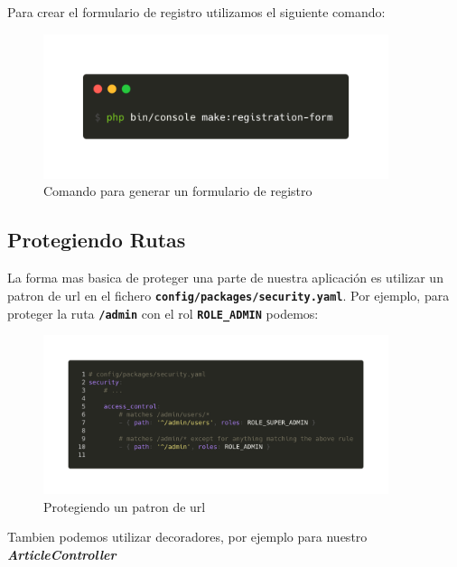 Para crear el formulario de registro utilizamos el siguiente comando:

\begin{figure}[ht]
  \centering
  \includegraphics[width=0.9\textwidth]{../assets/make_registration.png}
  \caption{Comando para generar un formulario de registro}
  \label{fig:make_registration}
\end{figure}

\subsection{Protegiendo Rutas}
La forma mas basica de proteger una parte de nuestra aplicación es utilizar un patron de url en el fichero \textbf{\texttt{config/packages/security.yaml}}. Por ejemplo, para proteger la ruta \textbf{\texttt{/admin}} con el rol \textbf{\texttt{ROLE\_ADMIN}} podemos:

\begin{figure}[ht]
  \centering
  \includegraphics[width=0.9\textwidth]{../assets/role_admin_route.png}
  \caption{Protegiendo un patron de url}
  \label{fig:role_admin_route}
\end{figure}

\clearpage
Tambien podemos utilizar decoradores, por ejemplo para nuestro \textbf{\textit{ArticleController}}

